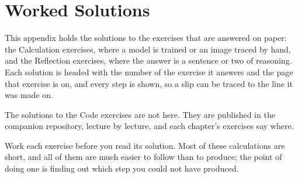 
\chapter{Worked Solutions}
\label{sol:ch:solutions}

This appendix holds the solutions to the exercises that are answered on paper: the Calculation
exercises, where a model is trained or an image traced by hand, and the Reflection exercises, where
the answer is a sentence or two of reasoning. Each solution is headed with the number of the
exercise it answers and the page that exercise is on, and every step is shown, so a slip can be
traced to the line it was made on.

The solutions to the Code exercises are not here. They are published in the companion repository,
lecture by lecture, and each chapter's exercises say where.

Work each exercise before you read its solution. Most of these calculations are short, and all of
them are much easier to follow than to produce; the point of doing one is finding out which step you
could not have produced.





